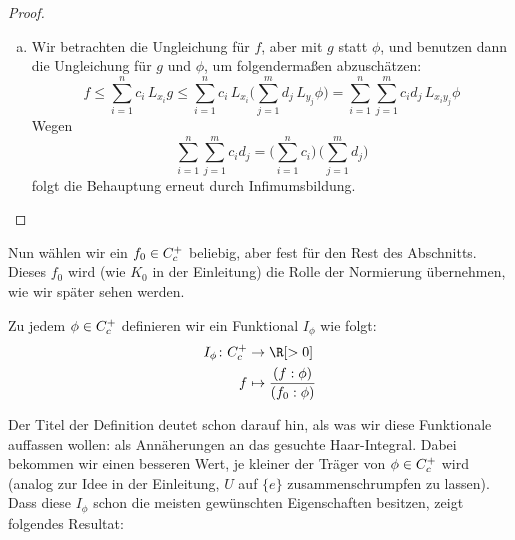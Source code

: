 \begin{proof}
\begin{enumerate}[(a)]
        \item
            Wir betrachten die Ungleichung für $f$, aber mit $g$ statt $\phi$, und
            benutzen dann die Ungleichung für $g$ und $\phi$, um folgendermaßen
            abzuschätzen:
            \[ f \leq \sum_{i=1}^n c_i \, L_{x_i}g 
                \leq \sum_{i=1}^n c_i \, L_{x_i}\biggl( 
                        \sum_{j=1}^m d_j \, L_{y_j}\phi
                    \biggr)
                = \sum_{i=1}^n\sum_{j=1}^m c_i d_j \, L_{x_iy_j}\phi
            \]
            Wegen
            \[ \sum_{i=1}^n\sum_{j=1}^m c_i d_j 
                =   \biggl( \sum_{i=1}^n c_i \biggr) \, 
                    \biggl( \sum_{j=1}^m d_j \biggr)
            \]
            folgt die Behauptung erneut durch Infimumsbildung.
    \end{enumerate}
\end{proof}

\medskip
Nun wählen wir ein $f_0\in C_c^+$ beliebig, aber fest für den Rest des
Abschnitts. Dieses $f_0$ wird (wie $K_0$ in der Einleitung) die Rolle der
Normierung übernehmen, wie wir später sehen werden.

\begin{thDef}
    Zu jedem $\phi \in C_c^+$ definieren wir ein Funktional $I_\phi$ wie folgt:
    \begin{align*}
        I_\phi\colon \contcompplus &\to         \R[>0]      \\
                                f  &\mapsto     \frac{(f : \phi)}{(f_0 : \phi)}
    \end{align*}
\end{thDef}
%
Der Titel der Definition deutet schon darauf hin, als was wir diese Funktionale
auffassen wollen: als Annäherungen an das gesuchte Haar-Integral. Dabei bekommen
wir einen besseren Wert, je kleiner der Träger von $\phi\in C_c^+$ wird
(analog zur Idee in der Einleitung, $U$ auf $\{e\}$ zusammenschrumpfen zu
lassen). Dass diese $I_\phi$ schon die meisten gewünschten Eigenschaften
besitzen, zeigt folgendes Resultat:

